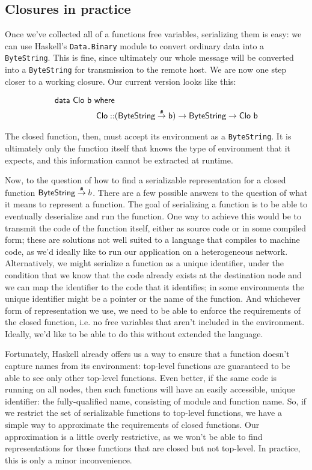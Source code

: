 \documentclass[preprint]{sigplanconf}
\begin{document}

\subsection{Closures in practice}

Once we've collected all of a functions free variables, serializing them is easy: we can use Haskell's \texttt{Data.Binary} module to convert ordinary data into a \texttt{ByteString}. This is fine, since ultimately our whole message will be converted into a \texttt{ByteString} for transmission to the remote host. We are now one step closer to a working closure. Our current version looks like this:

\begin{align*}
\textsf{data}~\textsf{Clo}~\textsf{b}~\textsf{where}&\\
\textsf{Clo}::&(\textsf{ByteString} \stackrel{\texttt{\#}}{\rightarrow} \textsf{b}) \rightarrow \textsf{ByteString} \rightarrow \textsf{Clo}~\textsf{b}
\end{align*}

The closed function, then, must accept its environment as a \texttt{ByteString}. It is ultimately only the function itself that knows the type of environment that it expects, and this information cannot be extracted at runtime.

Now, to the question of how to find a serializable representation for a closed function $\textsf{ByteString} \stackrel{\texttt{\#}}{\rightarrow} b$. There are a few possible answers to the question of what it means to represent a function. The goal of serializing a function is to be able to eventually deserialize and run the function. One way to achieve this would be to transmit the code of the function itself, either as source code or in some compiled form; these are solutions not well suited to a language that compiles to machine code, as we'd ideally like to run our application on a heterogeneous network. Alternatively, we might serialize a function as a unique identifier, under the condition that we know that the code already exists at the destination node and we can map the identifier to the code that it identifies; in some environments the unique identifier might be a pointer or the name of the function. And whichever form of representation we use, we need to be able to enforce the requirements of the closed function, i.e. no free variables that aren't included in the environment. Ideally, we'd like to be able to do this without extended the language.

Fortunately, Haskell already offers us a way to ensure that a function doesn't capture names from its environment: top-level functions are guaranteed to be able to see only other top-level functions. Even better, if the same code is running on all nodes, then such functions will have an easily accessible, unique identifier: the fully-qualified name, consisting of module and function name. So, if we restrict the set of serializable functions to top-level functions, we have a simple way to approximate the requirements of closed functions. Our approximation is a little overly restrictive, as we won't be able to find representations for those functions that are closed but not top-level. In practice, this is only a minor inconvenience.
\end{document}
